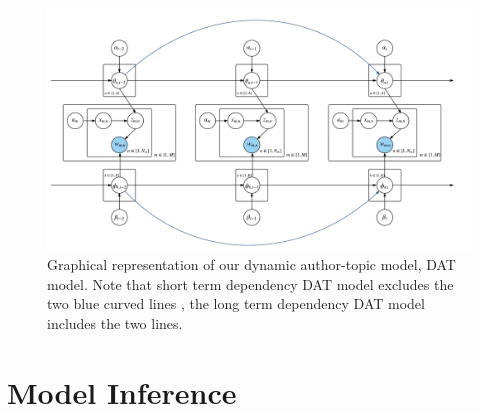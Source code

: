 \begin{figure}[h]
\centering
\includegraphics[width=\textwidth]{figures/ATOT_Graphic.png}
\caption{Graphical representation of our dynamic author-topic model, DAT model. Note that short term dependency DAT model excludes the two blue curved lines , the long term dependency DAT model includes the two lines.}
\label{fig:atot}
\end{figure}









\section{Model Inference}

